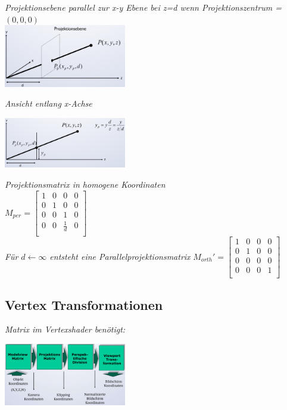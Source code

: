 \textit{Projektionsebene parallel zur x-y Ebene bei z=d wenn Projektionszentrum = $(0,0,0)$} \\

\includegraphics[width=0.4\textwidth]{assets/viewing-projektionsebene.png}

\textit{Ansicht entlang x-Achse}

\includegraphics[width=0.4\textwidth]{assets/viewing-projektionsebene-xachse.png}

\textit{Projektionsmatrix in homogene Koordinaten}\\
$M_{per} = \begin{bmatrix}
    1 & 0 & 0 & 0 \\
    0 & 1 & 0 & 0 \\
    0 & 0 & 1 & 0 \\
    0 & 0 & \frac{1}{d} & 0 \\
\end{bmatrix}$\\

\textit{Für $d \leftarrow \infty$ entsteht eine Parallelprojektionsmatrix}
$M_{orth}' = \begin{bmatrix}
    1 & 0 & 0 & 0 \\
    0 & 1 & 0 & 0 \\
    0 & 0 & 0 & 0 \\
    0 & 0 & 0 & 1 \\
\end{bmatrix}$

\subsection{Vertex Transformationen}

\textit{Matrix im Vertexshader benötigt:}

\includegraphics[width=0.4\textwidth]{assets/vertex-transformation.png}


